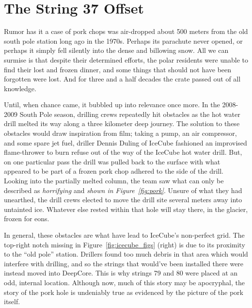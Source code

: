 \documentclass[main.tex]{subfiles}
\begin{document}
\section{The String 37 Offset}\label{app:pork}

Rumor has it a case of pork chops was air-dropped about 500 meters from the old south pole station long ago in the 1970s. 
Perhaps its parachute never opened, or perhaps it simply fell silently into the dense and billowing snow. 
All we can surmise is that despite their determined efforts, the polar residents were unable to find their lost and frozen dinner, and some things that should not have been forgotten were lost. 
And for three and a half decades the crate passed out of all knowledge. 

Until, when chance came, it bubbled up into relevance once more.
In the 2008-2009 South Pole season, drilling crews repeatedly hit obstacles as the hot water drill melted its way along a three kilometer deep journey. 
The solution to these obstacles would draw inspiration from film; taking a pump, an air compressor, and some spare jet fuel, driller Dennis Duling of IceCube fashioned an improvised flame-thrower to burn refuse out of the way of the IceCube hot water drill. 
But, on one particular pass the drill was pulled back to the surface with what appeared to be part of a frozen pork chop adhered to the side of the drill. 
Looking into the partially melted column, the team saw what can only be described as \textit{horrifying} and \textit{shown in Figure~\ref{fig:pork}}. 
Unsure of what they had unearthed, the drill crews elected to move the drill site several meters away into untainted ice. 
Whatever else rested within that hole will stay there, in the glacier, frozen for eons.


In general, these obstacles are what have lead to IceCube's non-perfect grid. The top-right notch missing in Figure~\ref{fig:icecube_figs} (right) is due to its proximity to the ``old pole'' station. 
Drillers found too much debris in that area which would interfere with drilling, and so the strings that would've been installed there were instead moved into DeepCore.
This is why strings 79 and 80 were placed at an odd, internal location. 
Although now, much of this story may be apocryphal, the story of the pork hole is undeniably true as evidenced by the picture of the pork itself. 
\end{document}
